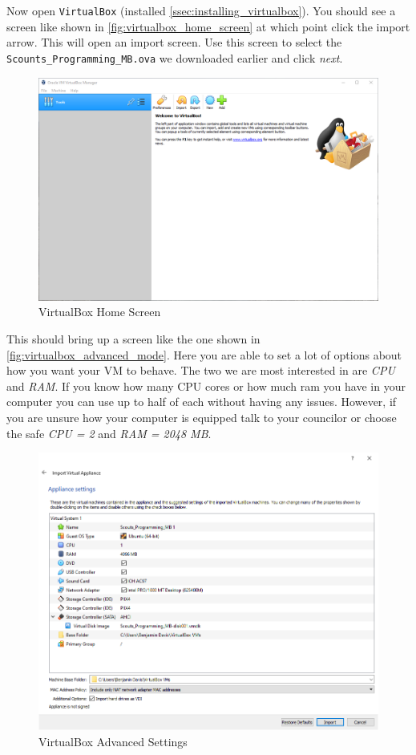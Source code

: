     Now open \texttt{VirtualBox} (installed \autoref{ssec:installing_virtualbox}).
    You should see a screen like shown in \autoref{fig:virtualbox_home_screen} at which point click the import arrow.
    This will open an import screen.
    Use this screen to select the \texttt{Scounts_Programming_MB.ova} we downloaded earlier and click \textit{next}.

    \begin{figure}[ht]
      \centering
      \includegraphics[width=0.8\linewidth]{virtualbox_home_screen.png}
      \caption{VirtualBox Home Screen}
      \label{fig:virtualbox_home_screen}
    \end{figure}
    \FloatBarrier

    This should bring up a screen like the one shown in \autoref{fig:virtualbox_advanced_mode}.
    Here you are able to set a lot of options about how you want your VM to behave.
    The two we are most interested in are \textit{CPU} and \textit{RAM}.
    If you know how many CPU cores or how much ram you have in your computer you can use up to half of each without having any issues.
    However, if you are unsure how your computer is equipped talk to your councilor or choose the safe \textit{CPU = 2} and \textit{RAM = 2048 MB}.

    \begin{figure}[ht]
      \centering
      \includegraphics[width=0.8\linewidth]{virtualbox_advanced_mode.png}
      \caption{VirtualBox Advanced Settings}
      \label{fig:virtualbox_advanced_mode}
    \end{figure}
    \FloatBarrier

